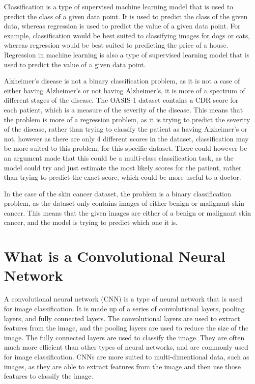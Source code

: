 \documentclass[]{final_report}
\begin{document}
Classification is a type of supervised machine learning model that is used to predict the class of a given data point. It is used to predict the class of the given data, whereas regression is used to predict the value of a given data point. For example, classification would be best suited to classifying images for dogs or cats, whereas regression would be best suited to predicting the price of a house. Regression in machine learning is also a type of supervised learning model that is used to predict the value of a given data point.

Alzheimer's disease is not a binary classification problem, as it is not a case of either having Alzheimer's or not having Alzheimer's, it is more of a spectrum of different stages of the disease. The OASIS-1 dataset contains a CDR score for each patient, which is a measure of the severity of the disease. This means that the problem is more of a regression problem, as it is trying to predict the severity of the disease, rather than trying to classify the patient as having Alzheimer's or not, however as there are only 4 different scores in the dataset, classification may be more suited to this problem, for this specific dataset. There could however be an argument made that this could be a multi-class classification task, as the model could try and just estimate the most likely scores for the patient, rather than trying to predict the exact score, which could be more useful to a doctor.

In the case of the skin cancer\cite{TAN2019105725} dataset, the problem is a binary classification problem, as the dataset only contains images of either benign or malignant skin cancer. This means that the given images are either of a benign or malignant skin cancer, and the model is trying to predict which one it is.

\section{What is a Convolutional Neural Network}
A convolutional neural network (CNN) is a type of neural network that is used for image classification. It is made up of a series of convolutional layers, pooling layers, and fully connected layers. The convolutional layers are used to extract features from the image, and the pooling layers are used to reduce the size of the image. The fully connected layers are used to classify the image. They are often much more efficient than other types of neural networks, and are commonly used for image classification. CNNs are more suited to multi-dimentional data, such as images, as they are able to extract features from the image and then use those features to classify the image.
\end{document}
